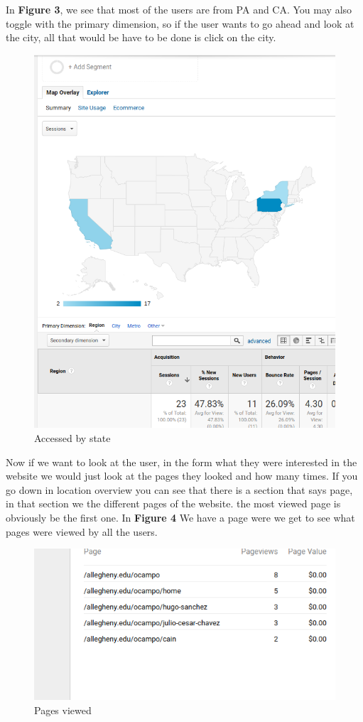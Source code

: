 \documentclass{article}
\begin{document}
In \textbf{Figure 3}, we see that most of the users are from PA and CA. You may also toggle with the primary dimension, so if the user wants to go ahead and look at the city, all that would be have to be done is click on the city. 
\begin{figure}[t]
\includegraphics[scale = .5]{city.png}
\centering
\caption{Accessed by state }
\end{figure}
Now if we want to look at the user, in the form what they were interested in the website we would just look at the pages they looked and how many times. If you go down in location overview you can see that there is a section that says page, in that section we the different pages of the website. 
the most viewed page is obviously be the first one. In \textbf{Figure 4 } We have a page were we get to see what pages were viewed by all the users. 
 
\begin{figure}[t]
\includegraphics[scale = .5]{pages.png}
\centering
\caption{Pages viewed}
\end{figure}
\end{document}
